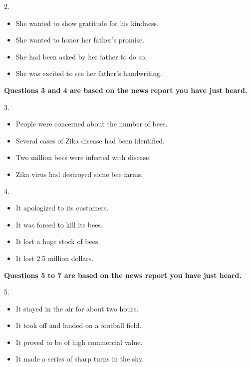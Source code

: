 \documentclass[UTF8,11pt]{ctexart}
\begin{document}
2.


\begin{itemize}[leftmargin=2em,itemsep=.2em,topsep=.4em]\item[A.] She wanted to show gratitude for his kindness.
\item[B.] She wanted to honor her father's promise.
\item[C.] She had been asked by her father to do so.
\item[D.] She was excited to see her father's handwriting.
\end{itemize}

\textbf{Questions 3 and 4 are based on the news report you have just heard.}


3.


\begin{itemize}[leftmargin=2em,itemsep=.2em,topsep=.4em]\item[A.] People were concerned about the number of bees.
\item[B.] Several cases of Zika disease had been identified.
\item[C.] Two million bees were infected with disease.
\item[D.] Zika virus had destroyed some bee farms.
\end{itemize}

4.


\begin{itemize}[leftmargin=2em,itemsep=.2em,topsep=.4em]\item[A.] It apologized to its customers.
\item[B.] It was forced to kill its bees.
\item[C.] It lost a huge stock of bees.
\item[D.] It lost 2.5 million dollars.
\end{itemize}

\textbf{Questions 5 to 7 are based on the news report you have just heard.}


5.


\begin{itemize}[leftmargin=2em,itemsep=.2em,topsep=.4em]\item[A.] It stayed in the air for about two hours.
\item[B.] It took off and landed on a football field.
\item[C.] It proved to be of high commercial value.
\item[D.] It made a series of sharp turns in the sky.
\end{itemize}
\end{document}
